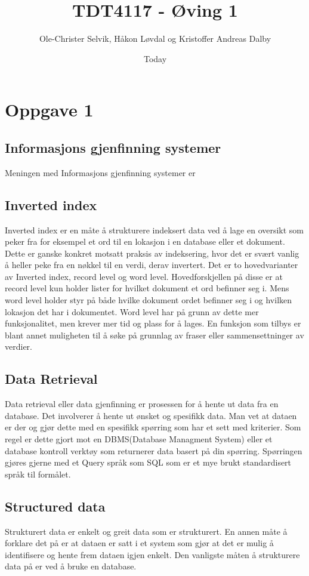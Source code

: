 \documentclass[]{article}
\begin{document}
\title{TDT4117 - Øving 1}
\author{Ole-Christer Selvik, Håkon Løvdal og Kristoffer Andreas Dalby}
\date{Today}
\maketitle

\section{Oppgave 1}
\subsection{Informasjons gjenfinning systemer}
Meningen med Informasjons gjenfinning systemer er 

\subsection{Inverted index}
Inverted index er en måte å strukturere indeksert data ved å lage en oversikt som peker fra for eksempel et ord til en lokasjon i en database eller et dokument. Dette er ganske konkret motsatt praksis av indeksering, hvor det er svært vanlig å heller peke fra en nøkkel til en verdi, derav invertert.
Det er to hovedvarianter av Inverted index, record level og word level. Hovedforskjellen på disse er at record level kun holder lister for hvilket dokument et ord befinner seg i. Mens word level holder styr på både hvilke dokument ordet befinner seg i og hvilken lokasjon det har i dokumentet. Word level har på grunn av dette mer funksjonalitet, men krever mer tid og plass for å lages. En funksjon som tilbys er blant annet muligheten til å søke på grunnlag av fraser eller sammensettninger av verdier.

\subsection{Data Retrieval}
Data retrieval eller data gjenfinning er prosessen for å hente ut data fra en database. Det involverer å hente ut ønsket og spesifikk data. Man vet at dataen er der og gjør dette med en spesifikk spørring som har et sett med kriterier. Som regel er dette gjort mot en DBMS(Database Managment System) eller et database kontroll verktøy som returnerer data basert på din spørring. Spørringen gjøres gjerne med et Query språk som SQL som er et mye brukt standardisert språk til formålet.

\subsection{Structured data}
Strukturert data er enkelt og greit data som er strukturert. En annen måte å forklare det på er at dataen er satt i et system som gjør at det er mulig å identifisere og hente frem dataen igjen enkelt. Den vanligste måten å strukturere data på er ved å bruke en database.  
\end{document}
